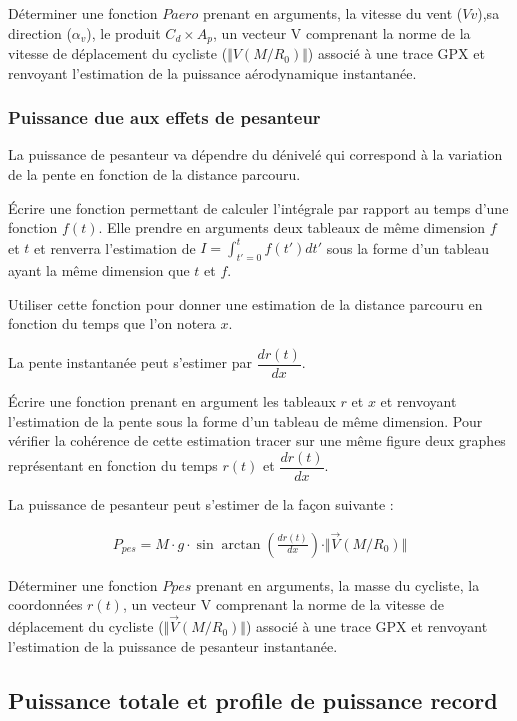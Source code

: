 \question{} Déterminer une fonction $Paero$ prenant en arguments, la vitesse du vent ($Vv$),sa direction ($\alpha_v$), le produit $C_d\times A_p$, un vecteur V comprenant la norme de la vitesse de déplacement du cycliste ($\Vert V(M/R_0)\Vert$) associé à une trace GPX et renvoyant l'estimation de la puissance aérodynamique instantanée.  

\subsubsection{Puissance due aux effets de pesanteur}

La puissance de pesanteur va dépendre du dénivelé qui correspond à la variation de la pente en fonction de la distance parcouru.

\question{} Écrire une fonction permettant de calculer l'intégrale par rapport au temps d'une fonction $f(t)$. Elle prendre en arguments deux tableaux de même dimension $f$ et $t$ et renverra l'estimation de $I=\displaystyle{\int_{t'=0}^t}f(t')dt'$ sous la forme d'un tableau ayant la même dimension que $t$ et $f$.

\question{} Utiliser cette fonction pour donner une estimation de la distance parcouru en fonction du temps que l'on notera $x$.

La pente instantanée peut s'estimer par $\dfrac{dr(t)}{dx}$.

\question{} Écrire une fonction prenant en argument les tableaux $r$ et $x$ et renvoyant l'estimation de la pente sous la forme d'un tableau de même dimension. Pour vérifier la cohérence de cette estimation tracer sur une même figure deux graphes représentant en fonction du temps $r(t)$ et $\dfrac{dr(t)}{dx}$.

La puissance de pesanteur peut s'estimer de la façon suivante : 

\begin{align*}
P_{pes}=M\cdot g \cdot \sin\arctan\left(\frac{dr(t)}{dx}\right)\cdot \Vert \overrightarrow{V}(M/R_0)\Vert 
\end{align*}

\question{} Déterminer une fonction $Ppes$ prenant en arguments, la masse du cycliste, la coordonnées $r(t)$, un vecteur V comprenant la norme de la vitesse de déplacement du cycliste ($\Vert \overrightarrow{V}(M/R_0)\Vert$) associé à une trace GPX et renvoyant l'estimation de la puissance de pesanteur instantanée.  

\subsection{Puissance totale et profile de puissance record}

